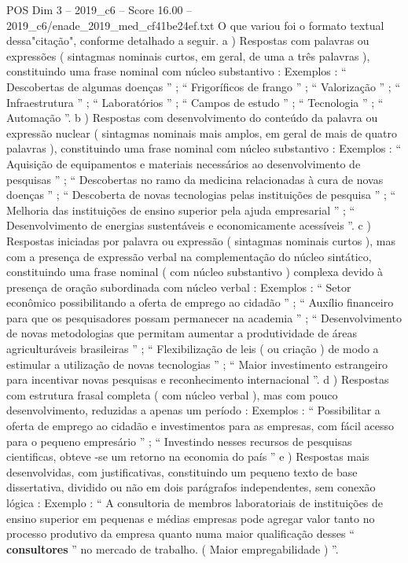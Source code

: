 \begin{textsample}{POS Dim 3 – 2019\_c6 – Score 16.00 – 2019\_c6/enade\_2019\_med\_cf41be24ef.txt}
O que variou foi o formato textual dessa"citação", conforme detalhado a seguir. a ) Respostas com palavras ou expressões ( sintagmas nominais curtos, em geral, de uma a três palavras ), constituindo uma frase nominal com núcleo substantivo : Exemplos : “ Descobertas de algumas doenças ” ; “ Frigoríficos de frango ” ; “ Valorização ” ; “ Infraestrutura ” ; “ Laboratórios ” ; “ Campos de estudo ” ; “ Tecnologia ” ; “ Automação ”. b ) Respostas com desenvolvimento do conteúdo da palavra ou expressão nuclear ( sintagmas nominais mais amplos, em geral de mais de quatro palavras ), constituindo uma frase nominal com núcleo substantivo : Exemplos : “ Aquisição de equipamentos e materiais necessários ao desenvolvimento de pesquisas ” ; “ Descobertas no ramo da medicina relacionadas à cura de novas doenças ” ; “ Descoberta de novas tecnologias pelas instituições de pesquisa ” ; “ Melhoria das instituições de ensino superior pela ajuda empresarial ” ; “ Desenvolvimento de energias sustentáveis e economicamente acessíveis ”. c ) Respostas iniciadas por palavra ou expressão ( sintagmas nominais curtos ), mas com a presença de expressão verbal na complementação do núcleo sintático, constituindo uma frase nominal ( com núcleo substantivo ) complexa devido à presença de oração subordinada com núcleo verbal : Exemplos : “ Setor econômico possibilitando a oferta de emprego ao cidadão ” ; “ Auxílio financeiro para que os pesquisadores possam permanecer na academia ” ; “ Desenvolvimento de novas metodologias que permitam aumentar a produtividade de áreas agriculturáveis brasileiras ” ; “ Flexibilização de leis ( ou criação ) de modo a estimular a utilização de novas tecnologias ” ; “ Maior investimento estrangeiro para incentivar novas pesquisas e reconhecimento internacional ”. d ) Respostas com estrutura frasal completa ( com núcleo verbal ), mas com pouco desenvolvimento, reduzidas a apenas um período : Exemplos : “ Possibilitar a oferta de emprego ao cidadão e investimentos para as empresas, com fácil acesso para o pequeno empresário ” ; “ Investindo nesses recursos de pesquisas cientificas, obteve -se um retorno na economia do país ” e ) Respostas mais desenvolvidas, com justificativas, constituindo um pequeno texto de base dissertativa, dividido ou não em dois parágrafos independentes, sem conexão lógica : Exemplo : “ A consultoria de membros laboratoriais de instituições de ensino superior em pequenas e médias empresas pode agregar valor tanto no processo produtivo da empresa quanto numa maior qualificação desses “ \textbf{consultores} ” no mercado de trabalho. ( Maior empregabilidade ) ”.

\end{textsample}
